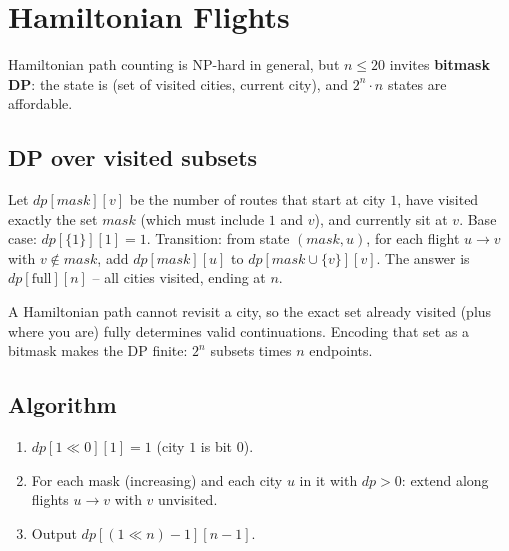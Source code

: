 \section{Hamiltonian Flights}
\label{sec:cses-hamiltonian-flights}


\begin{patternbox}
Hamiltonian path counting is NP-hard in general, but $n\le20$ invites
\textbf{bitmask DP}: the state is (set of visited cities, current city), and
$2^n\cdot n$ states are affordable.
\end{patternbox}

\subsection*{DP over visited subsets}

Let $\textit{dp}[\textit{mask}][v]$ be the number of routes that start at
city $1$, have visited exactly the set $\textit{mask}$ (which must include
$1$ and $v$), and currently sit at $v$. Base case:
$\textit{dp}[\{1\}][1]=1$. Transition: from state $(\textit{mask},u)$, for
each flight $u\to v$ with $v\notin\textit{mask}$, add
$\textit{dp}[\textit{mask}][u]$ to
$\textit{dp}[\textit{mask}\cup\{v\}][v]$. The answer is
$\textit{dp}[\text{full}][n]$ -- all cities visited, ending at $n$.

\begin{ideabox}
A Hamiltonian path cannot revisit a city, so the exact set already visited
(plus where you are) fully determines valid continuations. Encoding that set
as a bitmask makes the DP finite: $2^n$ subsets times $n$ endpoints.
\end{ideabox}

\subsection*{Algorithm}

\begin{enumerate}
  \item $\textit{dp}[1\ll0][1]=1$ (city $1$ is bit $0$).
  \item For each mask (increasing) and each city $u$ in it with
        $\textit{dp}>0$: extend along flights $u\to v$ with $v$ unvisited.
  \item Output $\textit{dp}[(1\ll n)-1][n-1]$.
\end{enumerate}

